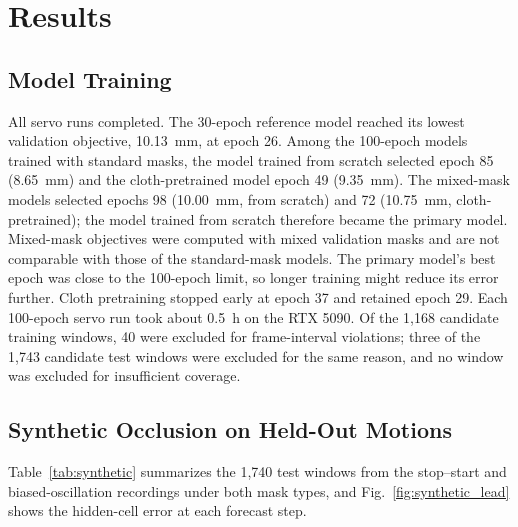 \section{Results}

\subsection{Model Training}
All servo runs completed. The 30-epoch reference model reached its lowest validation objective, 10.13~mm, at epoch 26. Among the 100-epoch models trained with standard masks, the model trained from scratch selected epoch 85 (8.65~mm) and the cloth-pretrained model epoch 49 (9.35~mm). The mixed-mask models selected epochs 98 (10.00~mm, from scratch) and 72 (10.75~mm, cloth-pretrained); the model trained from scratch therefore became the primary model. Mixed-mask objectives were computed with mixed validation masks and are not comparable with those of the standard-mask models. The primary model's best epoch was close to the 100-epoch limit, so longer training might reduce its error further. Cloth pretraining stopped early at epoch 37 and retained epoch 29. Each 100-epoch servo run took about 0.5~h on the RTX 5090. Of the 1,168 candidate training windows, 40 were excluded for frame-interval violations; three of the 1,743 candidate test windows were excluded for the same reason, and no window was excluded for insufficient coverage.

\subsection{Synthetic Occlusion on Held-Out Motions}
Table~\ref{tab:synthetic} summarizes the 1,740 test windows from the stop--start and biased-oscillation recordings under both mask types, and Fig.~\ref{fig:synthetic_lead} shows the hidden-cell error at each forecast step.

